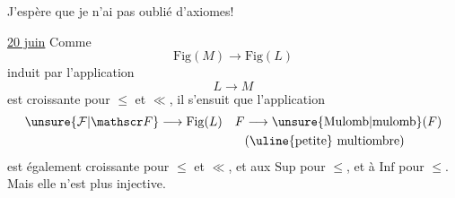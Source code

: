 J'espère que je n'ai pas oublié d'axiomes!

\uline{20 juin} Comme
\[
\mathrm{Fig}(M)\longrightarrow\mathrm{Fig}(L)
\]
induit par l'application
\[
L\longrightarrow M
\]
est croissante pour $\leq$ et $\ll$, il s'ensuit que l'application
\[
\begin{aligned}
{\unsure{\mathcal F|\mathscr F}}&\longrightarrow\mathrm{Fig}(L) & F&\longrightarrow\unsure{\mathrm{Mulomb}|\mathrm{mulomb}}(F)\\
&&&(\uline{\text{petite}}\ \text{multiombre})
\end{aligned}
\]
est également croissante pour $\leq$ et $\ll$, et  aux $\mathrm{Sup}$ pour $\leq$, et à $\mathrm{Inf}$ pour $\leq$. Mais elle n'est plus  injective.

